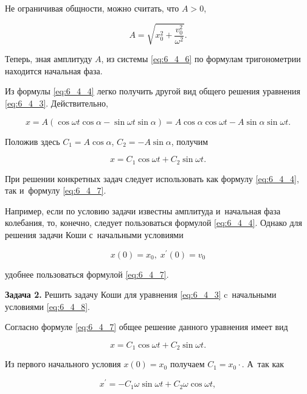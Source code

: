 \noindent
Не ограничивая общности, можно считать, что $A > 0$,

\begin{equation*}
A = \sqrt{x^{2}_{0} + \dfrac{v^{2}_{0}}{\omega^{2}}}.
\end{equation*}

Теперь, зная амплитуду $A$, из системы \eqref{eq:6_4_6} по формулам тригонометрии
находится начальная фаза.

Из формулы \eqref{eq:6_4_4} легко получить другой вид
общего решения уравнения \eqref{eq:6_4_3}. Действительно,

\begin{equation*}
x = A ( \cos \omega t \cos \alpha - \sin \omega t \sin \alpha ) =
A \cos \alpha \cos \omega t - A \sin \alpha \sin \omega t.
\end{equation*}

\noindent
Положив здесь $C_{1} = A \cos \alpha$, $C_{2} = -A \sin \alpha$, получим

\begin{equation}\label{eq:6_4_7}
x = C_{1} \cos \omega t + C_{2} \sin \omega t.
\end{equation}

При решении конкретных задач следует использовать как формулу \eqref{eq:6_4_4},
так и~формулу \eqref{eq:6_4_7}.

Например, если по условию задачи известны амплитуда и~начальная фаза колебания, то,
конечно, следует пользоваться формулой \eqref{eq:6_4_4}. Однако для решения
задачи Коши с~начальными условиями

\begin{equation}\label{eq:6_4_8}
x(0) = x_{0}, \; x^\prime (0) = v_{0}
\end{equation}

\noindent
удобнее пользоваться формулой \eqref{eq:6_4_7}.

\textbf{Задача 2.}\label{ex:6_4_2} Решить задачу Коши для уравнения \eqref{eq:6_4_3}
c~начальными условиями \eqref{eq:6_4_8}.

Согласно формуле \eqref{eq:6_4_7} общее решение данного уравнения имеет вид

\begin{equation*}
x = C_{1} \cos \omega t + C_{2} \sin \omega t.
\end{equation*}

Из первого начального условия $x(0) = x_{0}$ получаем $C_{1} = x_{0} \cdot$.
А~так как 

\begin{equation*}
x^\prime = -C_{1} \omega \sin \omega t + C_{2} \omega \cos \omega t,
\end{equation*}

